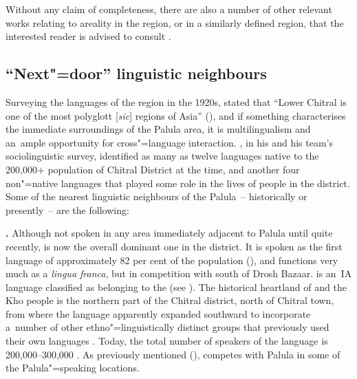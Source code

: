 Without any claim of completeness, there are also a number of other relevant works relating to areality in the region, or in a similarly defined region, that the interested reader is advised to consult \citep{bashir1988,bashir1996b,edelman1980,edelman1983,fussman1972,skalmowski1974,tikkanen1999,toporov1970}.


\subsection{``Next"=door'' linguistic neighbours}
\label{subsec:1-3-3}

Surveying the languages of the region in the 1920s, \citeauthor{morgenstierne1941} stated that ``Lower Chitral is one of the most polyglott [\textit{sic}] regions of Asia'' (\citeyear[7]{morgenstierne1941}), and if something characterises the immediate surroundings of the Palula area, it is multilingualism and an~ample opportunity for cross"=language interaction. \citet[10--23]{decker1992a}, in his and his team's sociolinguistic survey, identified as many as twelve languages native to the 200,000+ population of Chitral District at the time, and another four non"=native languages that played some role in the lives of people in the district. Some of the nearest linguistic neighbours of the Palula~-- historically or presently~-- are the following:


\textbf{\iliKhowar [khw].}
Although not spoken in any area immediately adjacent to Palula until quite recently, \iliKhowar is now the overall dominant one in the district. It is spoken as the first language of approximately 82 per cent of the population (\citealt[11]{decker1992a}), and functions very much as a \textit{lingua franca}, but in competition with \iliPashto south of Drosh Bazaar. \iliKhowar is an~IA language classified as belonging to the \iliChitralgroup (see ). The historical heartland of \iliKhowar and the Kho people is the northern part of the Chitral district, north of Chitral town, from where the language apparently expanded southward to incorporate a~number of other ethno"=linguistically distinct groups that previously used their own languages \citep[46--47]{morgenstierne1932}. Today, the total number of speakers of the language is 200,000--300,000 \citep[31--32]{decker1992a}. As previously mentioned (), \iliKhowar competes with Palula in some of the Palula"=speaking locations.


